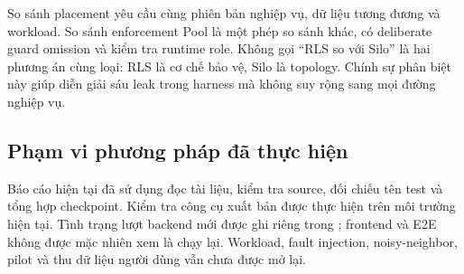 So sánh placement yêu cầu cùng phiên bản nghiệp vụ, dữ liệu tương đương và workload. So sánh enforcement Pool là một phép so sánh khác, có deliberate guard omission và kiểm tra runtime role. Không gọi ``RLS so với Silo'' là hai phương án cùng loại: RLS là cơ chế bảo vệ, Silo là topology. Chính sự phân biệt này giúp diễn giải sáu leak trong harness mà không suy rộng sang mọi đường nghiệp vụ.

\subsection{Phạm vi phương pháp đã thực hiện}
Báo cáo hiện tại đã sử dụng đọc tài liệu, kiểm tra source, đối chiếu tên test và tổng hợp checkpoint. Kiểm tra công cụ xuất bản được thực hiện trên môi trường hiện tại. Tình trạng lượt backend mới được ghi riêng trong ; frontend và E2E không được mặc nhiên xem là chạy lại. Workload, fault injection, noisy-neighbor, pilot và thu dữ liệu người dùng vẫn chưa được mở lại.
